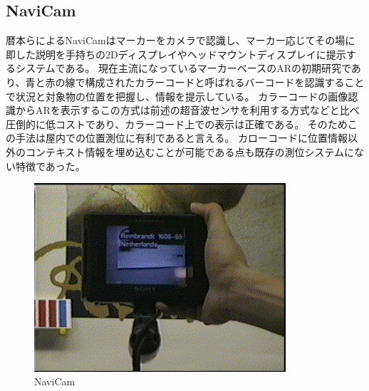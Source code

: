 \subsection{NaviCam}
暦本らによるNaviCam\cite{10.1145/215585.215639}はマーカーをカメラで認識し、マーカー応じてその場に即した説明を手持ちの2Dディスプレイやヘッドマウントディスプレイに提示するシステムである。
現在主流になっているマーカーベースのARの初期研究であり、青と赤の線で構成されたカラーコードと呼ばれるバーコードを認識することで状況と対象物の位置を把握し、情報を提示している。
カラーコードの画像認識からARを表示するこの方式は前述の超音波センサを利用する方式などと比べ圧倒的に低コストであり、カラーコード上での表示は正確である。
そのためこの手法は屋内での位置測位に有利であると言える。
カローコードに位置情報以外のコンテキスト情報を埋め込むことが可能である点も既存の測位システムにない特徴であった。

\begin{figure}[H]
  \centering
  \includegraphics[height=70mm]{images/NaviCam.png}
  \caption{NaviCam} \label{fig:NaviCam}
\end{figure}


